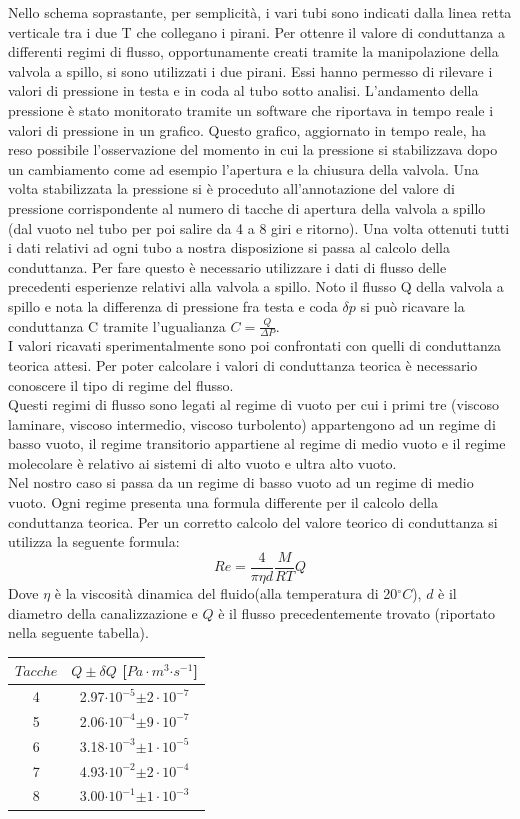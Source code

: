 \documentclass[a4paper,11pt]{article}
\begin{document}
Nello schema soprastante, per semplicità, i vari tubi sono indicati dalla linea retta verticale tra i due T che collegano i pirani.
Per ottenre il valore di conduttanza a differenti regimi di flusso, opportunamente creati tramite la manipolazione della valvola a spillo, si sono utilizzati i due pirani. Essi hanno permesso di rilevare i valori di pressione in testa e in coda al tubo sotto analisi. L'andamento della pressione è stato monitorato tramite un software che riportava in tempo reale i valori di pressione in un grafico. Questo grafico, aggiornato in tempo reale, ha reso possibile l'osservazione del momento in cui la pressione si stabilizzava dopo un cambiamento come ad esempio l'apertura e la chiusura della valvola. Una volta stabilizzata la pressione si è proceduto all'annotazione del valore di pressione corrispondente al numero di tacche di apertura della valvola a spillo (dal vuoto nel tubo per poi salire da 4 a 8 giri e ritorno).
Una volta ottenuti tutti i dati relativi ad ogni tubo a nostra disposizione si passa al calcolo della conduttanza. Per fare questo è necessario utilizzare i dati di flusso delle precedenti esperienze relativi alla valvola a spillo. Noto il flusso Q della valvola a spillo e nota la differenza di pressione fra testa e coda $\delta p$ si può ricavare la conduttanza C tramite l'ugualianza $ C = \frac{Q}{\Delta P} $.\\
I valori ricavati sperimentalmente sono poi confrontati con quelli di conduttanza teorica attesi.
Per poter calcolare i valori di conduttanza teorica è necessario conoscere il tipo di regime del flusso.\\
Questi regimi di flusso sono legati al regime di vuoto per cui i primi tre (viscoso laminare, viscoso intermedio, viscoso turbolento) appartengono ad un regime di basso vuoto, il regime transitorio appartiene al regime di medio vuoto e il regime molecolare è relativo ai sistemi di alto vuoto e ultra alto vuoto.\\
Nel nostro caso si passa da un regime di basso vuoto ad un regime di medio vuoto. Ogni regime presenta una formula differente per il calcolo della conduttanza teorica.
Per un corretto calcolo del valore teorico di conduttanza si utilizza la seguente formula:
$$ Re=\frac{4}{\pi \eta d}\frac{M}{RT}Q$$
Dove $ \eta $ è la viscosità dinamica del fluido(alla temperatura di 20$^\circ C$), $ d $ è il diametro della canalizzazione e $ Q $ è il flusso precedentemente trovato (riportato nella seguente tabella).
\begin{center}
\begin{tabular}{|c|c|}
\hline $Tacche$ & $Q\pm\delta Q$ [$Pa\cdot m^{3}$$\cdot s^{-1}$] \\ 

\hline 4 & 2.97$\cdot10^{-5}$$\pm 2\cdot10^{-7}$ \\ 
\hline 5 & 2.06$\cdot10^{-4}$$\pm 9\cdot10^{-7}$ \\ 
\hline 6 & 3.18$\cdot10^{-3}$$\pm 1\cdot10^{-5}$ \\ 
\hline 7 & 4.93$\cdot10^{-2}$$\pm 2\cdot10^{-4}$ \\ 
\hline 8 & 3.00$\cdot10^{-1}$$\pm 1\cdot10^{-3}$ \\ 
\hline 
\end{tabular}
\end{center}
\end{document}

